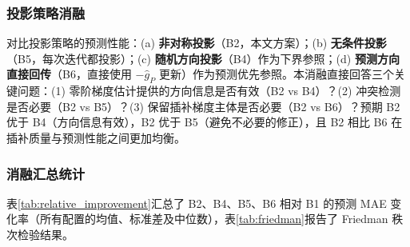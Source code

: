 \documentclass{article}
\begin{document}
\subsubsection{投影策略消融}

对比投影策略的预测性能：(a) \textbf{非对称投影}（B2，本文方案）；(b) \textbf{无条件投影}（B5，每次迭代都投影）；(c) \textbf{随机方向投影}（B4）作为下界参照；(d) \textbf{预测方向直接回传}（B6，直接使用 $-\hat{g}_P$ 更新）作为预测优先参照。本消融直接回答三个关键问题：(1) 零阶梯度估计提供的方向信息是否有效（B2 vs B4）？(2) 冲突检测是否必要（B2 vs B5）？(3) 保留插补梯度主体是否必要（B2 vs B6）？预期 B2 优于 B4（方向信息有效），B2 优于 B5（避免不必要的修正），且 B2 相比 B6 在插补质量与预测性能之间更加均衡。

\subsubsection{消融汇总统计}

表\ref{tab:relative_improvement}汇总了 B2、B4、B5、B6 相对 B1 的预测 MAE 变化率（所有配置的均值、标准差及中位数），表\ref{tab:friedman}报告了 Friedman 秩次检验结果。

\begin{table}[htbp]
\centering
\caption{各策略相对 B1 的预测MAE变化率汇总}
\label{tab:relative_improvement}
\footnotesize
\setlength{\tabcolsep}{2.5pt}
\renewcommand{\arraystretch}{0.92}
\end{table}

\begin{table}[htbp]
\centering
\caption{Friedman 平均秩次与 Nemenyi 事后检验}
\label{tab:friedman}
\footnotesize
\setlength{\tabcolsep}{2.5pt}
\renewcommand{\arraystretch}{0.92}
\end{table}
\end{document}
